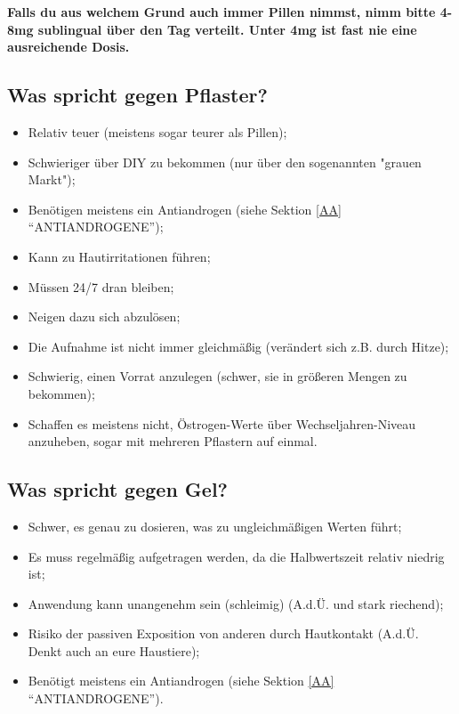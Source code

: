 \documentclass{article}
\begin{document}
\textbf{Falls du aus welchem Grund auch immer Pillen nimmst, nimm bitte 4-8mg sublingual über den Tag verteilt. Unter 4mg ist fast nie eine ausreichende Dosis.}

\subsection{Was spricht gegen Pflaster?}

\begin{itemize}
  \item Relativ teuer (meistens sogar teurer als Pillen);
  \item Schwieriger über DIY zu bekommen (nur über den sogenannten "grauen Markt");
  \item Benötigen meistens ein Antiandrogen (siehe Sektion \ref{AA} “ANTIANDROGENE”);
  \item Kann zu Hautirritationen führen;
  \item Müssen 24/7 dran bleiben;
  \item Neigen dazu sich abzulösen;
  \item Die Aufnahme ist nicht immer gleichmäßig (verändert sich z.B. durch Hitze);
  \item Schwierig, einen Vorrat anzulegen (schwer, sie in größeren Mengen zu bekommen);
  \item Schaffen es meistens nicht, Östrogen-Werte über Wechseljahren-Niveau anzuheben, sogar mit mehreren Pflastern auf einmal.
\end{itemize}

\subsection{Was spricht gegen Gel?}

\begin{itemize}
  \item Schwer, es genau zu dosieren, was zu ungleichmäßigen Werten führt;
  \item Es muss regelmäßig aufgetragen werden, da die Halbwertszeit relativ niedrig ist;
  \item Anwendung kann unangenehm sein (schleimig) (A.d.Ü. und stark riechend);
  \item Risiko der passiven Exposition von anderen durch Hautkontakt (A.d.Ü. Denkt auch an eure Haustiere);
  \item Benötigt meistens ein Antiandrogen (siehe Sektion \ref{AA} “ANTIANDROGENE”).
\end{itemize}
\end{document}
